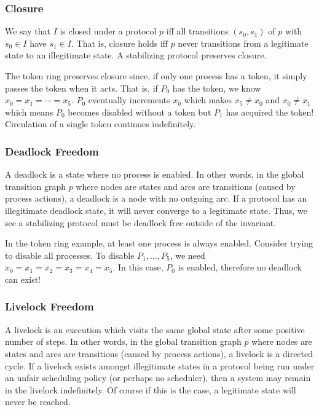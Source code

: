 \subsubsection{Closure}

We say that $I$ is closed under a protocol $p$ iff all transitions $(s_0, s_1)$ of $p$ with $s_0 \in I$ have $s_1 \in I$.
That is, closure holds iff $p$ never transitions from a legitimate state to an illegitimate state.
A stabilizing protocol preserves closure.

The token ring preserves closure since, if only one process has a token, it simply passes the token when it acts.
That is, if $P_0$ has the token, we know $x_0=x_1=\cdots=x_5$.
$P_0$ eventually increments $x_0$ which makes $x_5\neq x_0$ and $x_0\neq x_1$ which means $P_0$ becomes disabled without a token but $P_1$ has acquired the token!
Circulation of a single token continues indefinitely.

\subsubsection{Deadlock Freedom}

A deadlock is a state where no process is enabled.
In other words, in the global transition graph $p$ where nodes are states and arcs are transitions (caused by process actions), a deadlock is a node with no outgoing arc.
If a protocol has an illegitimate deadlock state, it will never converge to a legitimate state.
Thus, we see a stabilizing protocol must be deadlock free outside of the invariant.

In the token ring example, at least one process is always enabled.
Consider trying to disable all processes.
To disable $P_1,\dots,P_5$, we need $x_0=x_1=x_2=x_3=x_4=x_5$.
In this case, $P_0$ is enabled, therefore no deadlock can exist!

\subsubsection{Livelock Freedom}

A livelock is an execution which visits the same global state after some positive number of steps.
In other words, in the global transition graph $p$ where nodes are states and arcs are transitions (caused by process actions), a livelock is a directed cycle.
If a livelock exists amongst illegitimate states in a protocol being run under an unfair scheduling policy (or perhaps no scheduler), then a system may remain in the livelock indefinitely.
Of course if this is the case, a legitimate state will never be reached.

